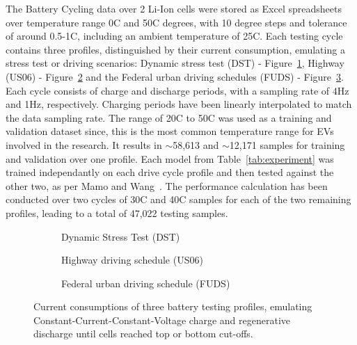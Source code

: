 %
The Battery Cycling data over 2 Li-Ion cells were stored as Excel spreadsheets over temperature range 0\textdegree{}C and 50\textdegree{}C degrees, with 10 degree steps and tolerance of around 0.5-1\textdegree{}C, including an ambient temperature of 25\textdegree{}C.
Each testing cycle contains three profiles, distinguished by their current consumption, emulating a stress test or driving scenarios: Dynamic stress test (DST) - Figure~\ref{subfig:profs-DST}, Highway (US06) - Figure~\ref{subfig:profs-US} and the Federal urban driving schedules (FUDS) - Figure~\ref{subfig:profs-FUDS}.
Each cycle consists of charge and discharge periods, with a sampling rate of 4Hz and 1Hz, respectively.
Charging periods have been linearly interpolated to match the data sampling rate.
The range of 20\textdegree{}C to 50\textdegree{}C was used as a training and validation dataset since, this is the most common temperature range for EVs involved in the research.
It results in $\sim$58,613 and $\sim$12,171 samples for training and validation over one profile.
Each model from \mbox{Table~\ref{tab:experiment}} was trained independantly on each drive cycle profile and then tested against the other two, as per Mamo and Wang~\cite{mamo_long_2020}.
The performance calculation has been conducted over two cycles of 30\textdegree{}C and 40\textdegree{}C samples for each of the two remaining profiles, leading to a total of 47,022 testing samples.
\begin{figure*}[htbp]
    \centering
    \begin{subfigure}[b]{0.28\textheight}
        \centering
        
        \caption{Dynamic Stress Test (DST)}
        \label{subfig:profs-DST}
    \end{subfigure}
    \hfill
    \begin{subfigure}[b]{0.28\textheight}
        \centering
        
        \caption{Highway driving schedule (US06)}
        \label{subfig:profs-US}
    \end{subfigure}
    \hfill
    \begin{subfigure}[b]{0.28\textheight}
        \centering
        
        \caption{Federal urban driving schedule (FUDS)}
        \label{subfig:profs-FUDS}
    \end{subfigure}
    \caption{Current consumptions of three battery testing profiles, emulating Constant-Current-Constant-Voltage charge and regenerative discharge until cells reached top or bottom cut-offs.}
    \label{fig:current-profs}
\end{figure*}

